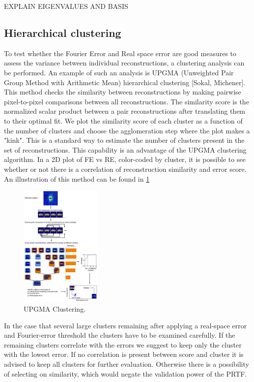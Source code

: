 EXPLAIN EIGENVALUES AND BASIS




\subsection{Hierarchical clustering}
To test whether the Fourier Error and Real space error are good measures to assess the variance between individual reconstructions, a clustering analysis can be performed. An example of such an analysis is UPGMA (Unweighted Pair Group Method with Arithmetic Mean) hierarchical clustering [Sokal, Michener]. This method checks the similarity between reconstructions by making pairwise pixel-to-pixel comparisons between all reconstructions. The similarity score is the normalized scalar product between a pair reconstructions after translating them to their optimal fit. We plot the similarity score of  each cluster as a function of the number of clusters and choose the agglomeration step where the plot makes a "kink". This is a standard way to estimate the number of clusters present in the set of reconstructions. This capability is an advantage of the UPGMA clustering algorithm. In a 2D plot of FE vs RE, color-coded by cluster, it is possible to see whether or not there is a correlation of reconstruction similarity and error score. An illustration of this method can be found in \ref{fig:UPGMA}
 
\begin{figure}[h]\label{fig:UPGMA}
\centering 
\includegraphics[width=40mm]{UPGMA_Clustering.jpg}
\caption{UPGMA Clustering.}
\end{figure}

In the case that several large clusters remaining after applying a real-space error and Fourier-error threshold the clusters have to be examined carefully. If the remaining clusters correlate with the errors we suggest to keep only the cluster with the lowest error. If no correlation is present between score and cluster it is advised to keep all clusters for further evaluation. Otherwise there is a possibility of selecting on similarity, which would negate the validation power of the PRTF.

